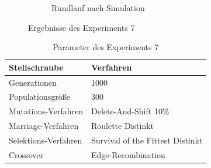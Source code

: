 \begin{figure}
\begin{subfigure}[Simulation]{0.49\textwidth}
		\caption{Rundlauf nach Simulation}
		\label{fig:experiment72}
	\end{subfigure}
\caption{Ergebnisse des Experiments 7}
\label{fig:experiment7}
\end{figure}

\begin{table}[H]
\centering
\caption{Parameter des Experiments 7}
\begin{tabular}{ll}
Stellschraube & Verfahren \\
\hline
Generationen & 1000 \\
Populationsgröße & 300 \\
Mutations-Verfahren & Delete-And-Shift 10\% \\
Marriage-Verfahren & Roulette Distinkt \\
Selektions-Verfahren & Survival of the Fittest Distinkt \\
Crossover & Edge-Recombination
\end{tabular}
\label{tab:e7}
\end{table}

